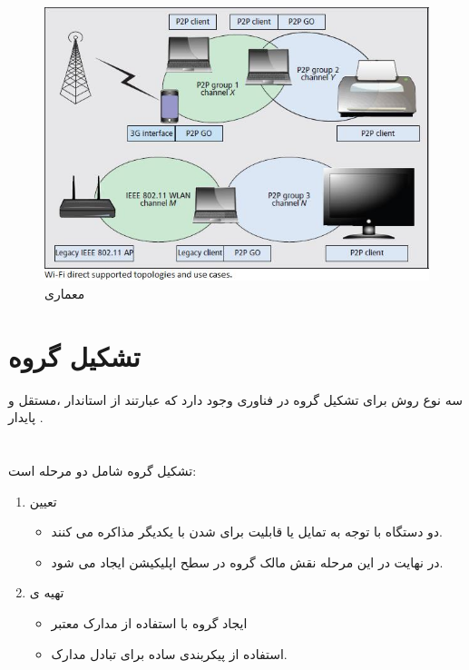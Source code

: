 \begin{figure}
	\centerline{
	\includegraphics{images/wifidirectarchitecture.jpg}}
	\caption{معماری }
	\label{fig:WifiDirectArchitecture}
\end{figure}

\section{تشکیل گروه}
سه نوع روش برای تشکیل گروه در فناوری
وجود دارد که عبارتند از استاندار
،مستقل
و پایدار
.
\\ \\ \\
تشکیل گروه شامل دو مرحله است:
\begin{enumerate}
	\item تعیین 
	\begin{itemize}
		\item  دو دستگاه با توجه به تمایل یا قابلیت برای  شدن با یکدیگر مذاکره می کنند.
		\item در نهایت در این مرحله نقش مالک گروه در سطح اپلیکیشن ایجاد می شود. 
	\end{itemize}
	\item تهیه ی 
	\begin{itemize}
		\item ایجاد  گروه با استفاده از مدارک معتبر
		\item استفاده از پیکربندی ساده  برای تبادل مدارک.
	\end{itemize}
\end{enumerate}

